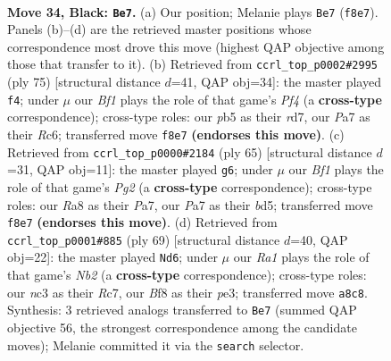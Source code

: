 \documentclass[11pt]{article}
\begin{document}
\clearpage

\begin{figure}[p]\centering
\begin{subfigure}{0.46\textwidth}\centering
\resizebox{\linewidth}{!}{%
\newchessgame
\chessboard[
  setfen={r4b2/p6k/P5p1/1P2N1P1/5P2/2N5/8/R1B1K3 b Q - 2 34},
  showmover=false,
  pgfstyle=straightmove, color=movearrow, markmove={f8-e7}
]}
\caption{}
\end{subfigure}\hfill
\begin{subfigure}{0.46\textwidth}\centering
\resizebox{\linewidth}{!}{%
\newchessgame
\chessboard[
  setfen={6k1/3R4/2r1pbpp/1N3p2/3P3P/6P1/5P2/6K1 b - - 0 38},
  showmover=false,
  pgfstyle=straightmove, color=movearrow, markmove={f5-f4}
]}
\caption{}
\end{subfigure}
\\[4pt]
\begin{subfigure}{0.46\textwidth}\centering
\resizebox{\linewidth}{!}{%
\newchessgame
\chessboard[
  setfen={8/p3k1p1/8/3B1p1p/1P3P1P/P2R2P1/2r2b2/7K b - - 1 33},
  showmover=false,
  pgfstyle=straightmove, color=movearrow, markmove={g7-g6}
]}
\caption{}
\end{subfigure}\hfill
\begin{subfigure}{0.46\textwidth}\centering
\resizebox{\linewidth}{!}{%
\newchessgame
\chessboard[
  setfen={8/pnr1kpp1/1p6/4N1P1/P2R4/4P3/5PK1/8 b - - 2 35},
  showmover=false,
  pgfstyle=straightmove, color=movearrow, markmove={b7-d6}
]}
\caption{}
\end{subfigure}
\caption{\textbf{Move 34, Black: \texttt{Be7}.} (a) Our position; Melanie plays \texttt{Be7} (\texttt{f8e7}). Panels (b)--(d) are the retrieved master positions whose correspondence most drove this move (highest QAP objective among those that transfer to it). (b) Retrieved from \texttt{ccrl\_top\_p0002\#2995} (ply 75) [structural distance $d$=41, QAP obj=34]: the master played \texttt{f4}; under $\mu$ our \emph{Bf1} plays the role of that game's \emph{Pf4} (a \textbf{cross-type} correspondence); cross-type roles: our \emph{p}b5 as their \emph{r}d7, our \emph{P}a7 as their \emph{R}c6; transferred move \texttt{f8e7} \textbf{(endorses this move)}. (c) Retrieved from \texttt{ccrl\_top\_p0000\#2184} (ply 65) [structural distance $d$=31, QAP obj=11]: the master played \texttt{g6}; under $\mu$ our \emph{Bf1} plays the role of that game's \emph{Pg2} (a \textbf{cross-type} correspondence); cross-type roles: our \emph{R}a8 as their \emph{P}a7, our \emph{P}a7 as their \emph{b}d5; transferred move \texttt{f8e7} \textbf{(endorses this move)}. (d) Retrieved from \texttt{ccrl\_top\_p0001\#885} (ply 69) [structural distance $d$=40, QAP obj=22]: the master played \texttt{Nd6}; under $\mu$ our \emph{Ra1} plays the role of that game's \emph{Nb2} (a \textbf{cross-type} correspondence); cross-type roles: our \emph{n}c3 as their \emph{R}c7, our \emph{B}f8 as their \emph{p}e3; transferred move \texttt{a8c8}. Synthesis: 3 retrieved analogs transferred to \texttt{Be7} (summed QAP objective 56, the strongest correspondence among the candidate moves); Melanie committed it via the \texttt{search} selector.}
\label{fig:thought-m67}
\end{figure}
\end{document}
